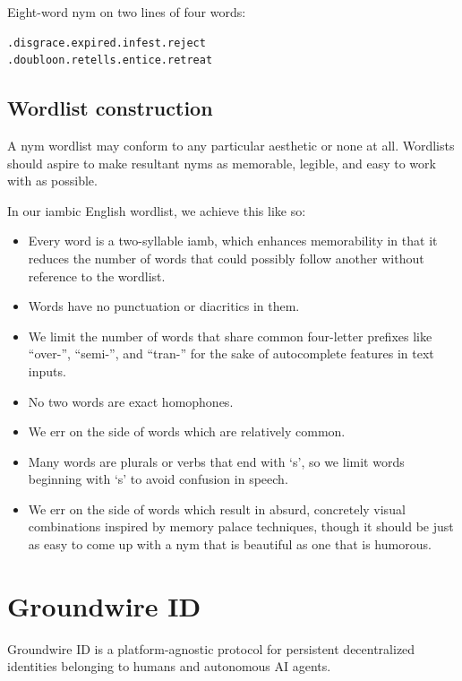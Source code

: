 \documentclass[twoside]{article}
\begin{document}
Eight-word nym on two lines of four words:

\begin{lstlisting}[style=listingblock]
.disgrace.expired.infest.reject
.doubloon.retells.entice.retreat
\end{lstlisting}

\subsection{Wordlist construction}\label{wordlist-construction}

A nym wordlist may conform to any particular aesthetic or none at all.
Wordlists should aspire to make resultant nyms as memorable, legible,
and easy to work with as possible.

In our iambic English wordlist, we achieve this like so:

\begin{itemize}[noitemsep,topsep=2pt]

\item
  Every word is a two-syllable iamb, which enhances memorability in that
  it reduces the number of words that could possibly follow another
  without reference to the wordlist.
\item
  Words have no punctuation or diacritics in them.
\item
  We limit the number of words that share common four-letter prefixes
  like ``over-'', ``semi-'', and ``tran-'' for the sake of
  autocomplete features in text inputs.
\item
  No two words are exact homophones.
\item
  We err on the side of words which are relatively common.
\item
  Many words are plurals or verbs that end with `s', so we limit words
  beginning with `s' to avoid confusion in speech.
\item
  We err on the side of words which result in absurd, concretely visual
  combinations inspired by memory palace techniques, though it should be
  just as easy to come up with a nym that is beautiful as one that is
  humorous.
\end{itemize}

\section{Groundwire ID}\label{groundwire-id}

Groundwire ID is a platform-agnostic protocol for persistent
decentralized identities belonging to humans and autonomous AI agents.
\end{document}
